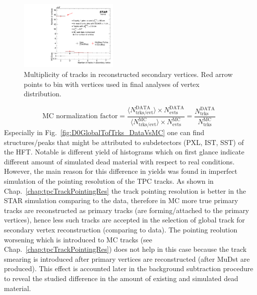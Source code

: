 \begin{figure}\vspace{-2\baselineskip}%
  \centering%
  \includegraphics[width=0.425\textwidth]{graphics/deadMaterial/NTracksInVertex_DataVsMC.pdf}\vspace*{-10pt}%
  \caption[Multiplicity of tracks in reconstructed secondary vertices.]{Multiplicity of tracks in reconstructed secondary vertices. Red arrow points to bin with vertices used in final analyses of vertex distribution.}\label{fig:nTrksInSecVx}%
\end{figure}%
\begin{equation}\label{eq:mcNormDeadMat}
\text{MC normalization factor}=\frac{\langle N_{\text{trks/evt}}^{\text{DATA}}\rangle \times N_{\text{evts}}^{\text{DATA}}}{ \langle N_{\text{trks/evt}}^{\text{MC}}\rangle \times N_{\text{evts}}^{\text{MC}} } = \frac{N_{\text{trks}}^{\text{DATA}}}{N_{\text{trks}}^{\text{MC}}}
\end{equation}%
Especially in Fig.~\ref{fig:D0GlobalTofTrks_DataVsMC} one can find structures/peaks that might be attributed to subdetectors (PXL, IST, SST) of the HFT. Notable is different yield of histograms which on first glance indicate different amount of simulated dead material with respect to real conditions. However, the main reason for this difference in yields was found in imperfect simulation of the pointing resolution of the TPC tracks. As shown in Chap.~\ref{chap:tpcTrackPointingRes} the track pointing resolution is better in the STAR simulation comparing to the data, therefore in MC more true primary tracks are reconstructed as primary tracks (are forming/attached to the primary vertices), hence less such tracks are accepted in the selection of global track for secondary vertex reconstruction (comparing to data). The pointing reolution worsening which is introduced to MC tracks (see Chap.~\ref{chap:tpcTrackPointingRes}) does not help in this case because the track smearing is introduced after primary vertices are reconstructed (after MuDst are produced). This effect is accounted later in the background subtraction procedure to reveal the studied difference in the amount of existing and simulated dead material.

